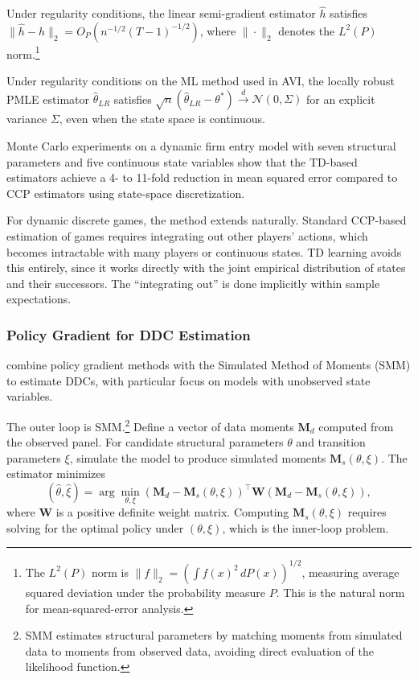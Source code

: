 \begin{theorem}
Under regularity conditions, the linear semi-gradient estimator $\hat{h}$ satisfies $\|\hat{h} - h\|_2 = O_P(n^{-1/2}(T-1)^{-1/2})$, where $\|\cdot\|_2$ denotes the $L^2(P)$ norm.\footnote{The $L^2(P)$ norm is $\|f\|_2 = (\int f(x)^2 \, dP(x))^{1/2}$, measuring average squared deviation under the probability measure $P$. This is the natural norm for mean-squared-error analysis.}
\end{theorem}

\begin{theorem}
Under regularity conditions on the ML method used in AVI, the locally robust PMLE estimator $\hat{\theta}_{LR}$ satisfies $\sqrt{n}(\hat{\theta}_{LR} - \theta^*) \xrightarrow{d} \mathcal{N}(0, \Sigma)$ for an explicit variance $\Sigma$, even when the state space is continuous.
\end{theorem}

Monte Carlo experiments on a dynamic firm entry model with seven structural parameters and five continuous state variables show that the TD-based estimators achieve a 4- to 11-fold reduction in mean squared error compared to CCP estimators using state-space discretization.

For dynamic discrete games, the method extends naturally. Standard CCP-based estimation of games requires integrating out other players' actions, which becomes intractable with many players or continuous states. TD learning avoids this entirely, since it works directly with the joint empirical distribution of states and their successors. The ``integrating out'' is done implicitly within sample expectations.


\subsubsection{Policy Gradient for DDC Estimation}

\citet{HuYang2025} combine policy gradient methods with the Simulated Method of Moments (SMM) to estimate DDCs, with particular focus on models with unobserved state variables.

The outer loop is SMM.\footnote{SMM \citep{GourierouxMonfort1993} estimates structural parameters by matching moments from simulated data to moments from observed data, avoiding direct evaluation of the likelihood function.} Define a vector of data moments $\mathbf{M}_d$ computed from the observed panel. For candidate structural parameters $\theta$ and transition parameters $\xi$, simulate the model to produce simulated moments $\mathbf{M}_s(\theta, \xi)$. The estimator minimizes
\begin{equation}
(\hat{\theta}, \hat{\xi}) = \arg\min_{\theta, \xi} \left(\mathbf{M}_d - \mathbf{M}_s(\theta, \xi)\right)^\top \mathbf{W} \left(\mathbf{M}_d - \mathbf{M}_s(\theta, \xi)\right), \label{eq:hy_outer}
\end{equation}
where $\mathbf{W}$ is a positive definite weight matrix. Computing $\mathbf{M}_s(\theta, \xi)$ requires solving for the optimal policy under $(\theta, \xi)$, which is the inner-loop problem.

